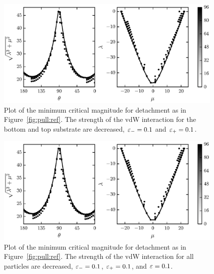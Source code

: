   \begin{figure}[t]
      \begin{center}
         \includegraphics{./fig/ch3/pull/eb0.1_et0.1/grid.eps}
      \end{center}      
      \caption{Plot of the minimum critical magnitude for detachment as in Figure~\ref{fig:pull:ref}. The strength of the vdW interaction for the bottom and top substrate are decreased, $\varepsilon_-=0.1$ and $\varepsilon_+=0.1$.
      \label{fig:pull:eb0.1_et0.1}}
   \end{figure}
   
   \begin{figure}[t]
      \begin{center}
         \includegraphics{./fig/ch3/pull/eb0.1_et0.1_e0.1/grid.eps}
      \end{center}      
      \caption{Plot of the minimum critical magnitude for detachment as in Figure~\ref{fig:pull:ref}. The strength of the vdW interaction for all particles are decreased, $\varepsilon_-=0.1$, $\varepsilon_+=0.1$, and $\varepsilon=0.1$.
      \label{fig:pull:eb0.1_et0.1_e0.1}}
   \end{figure}

